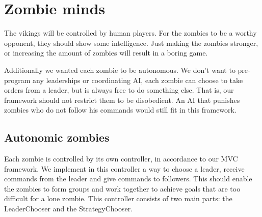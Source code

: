 \section{Zombie minds}

The vikings will be controlled by human players. For the zombies to be a worthy opponent, they should show some intelligence. Just making the zombies stronger, or increasing the amount of zombies will result in a boring game.

Additionally we wanted each zombie to be autonomous. We don't want to pre-program any leaderships or coordinating AI, each zombie can choose to take orders from a leader, but is always free to do something else. That is, our framework should not restrict them to be disobedient. An AI that punishes zombies who do not follow his commands would still fit in this framework.

\subsection{Autonomic zombies}
Each zombie is controlled by its own controller, in accordance to our MVC framework. We implement in this controller a way to choose a leader, receive commands from the leader and give commands to followers. This should enable the zombies to form groups and work together to achieve goals that are too difficult for a lone zombie. This controller consists of two main parts: the LeaderChooser and the StrategyChooser.

